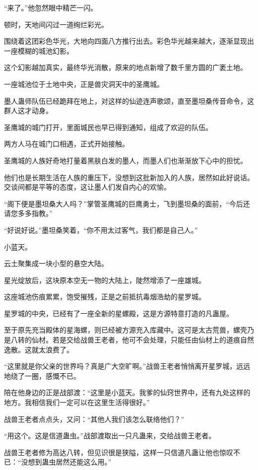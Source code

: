 \begin{this_body}
“来了。”他忽然眼中精芒一闪。

顿时，天地间闪过一道绚烂彩光。

围绕着这团彩色华光，大地向四面八方推行出去。彩色华光越来越大，逐渐显现出一座模糊的城池幻影。

这个幻影越加真实，最终华光消散，原来的地点新增了数千里方圆的广袤土地。

一座城池位于土地中央，正是兽灾洞天中的圣鹰城。

墨人蛊师队伍已经跪拜在地上，对这样的仙迹连声歌颂，直至墨坦桑传音命令，这群人这才动身。

圣鹰城的城门打开，里面城民也早已得到通知，组成了欢迎的队伍。

两方人马在城门口相遇，正式开始接触。

圣鹰城的人族好奇地打量着黑肤白发的墨人，而墨人们也渐渐放下心中的担忧。

他们也是长期生活在人族的重压下，没想到这批新加入的人族，居然如此好说话。交谈间都是平等的态度，这让墨人们发自内心的欢愉。

“阁下便是墨坦桑大人吗？”掌管圣鹰城的巨鹰勇士，飞到墨坦桑的面前，“今后还请您多多指教。”

“好说好说。”墨坦桑笑着，“你不用太过客气，我们都是自己人。”

小蓝天。

云土聚集成一块小型的悬空大陆。

星光绽放后，这块原本空无一物的大陆上，陡然增添了一座雄城。

这座城池伤痕累累，饱受摧残，正是之前抵抗毒烟浩劫的星罗城。

星罗城的中央，已经有了一座全新的星螺殿，这是方源特意打造的凡蛊屋。

至于原先充当殿体的星海螺，则已经被方源充入库藏中。这可是太古荒兽，螺壳乃是八转的仙材。若是交给战兽王老者，他可不会处理，只能任由仙材上的道痕自然逸散。这就太浪费了。

“这里就是你父亲的世界吗？真是广大空旷啊。”战兽王老者悄悄离开星罗城，远远地绕了一圈，感慨不已。

陪在他身边的正是战部渡：“这里是小蓝天。我爹的仙窍世界中，还有九处这样的地方。我相信我们一定可以在这里生活得很好。”

战兽王老者点点头，又问：“其他人我们该怎么联络他们？”

“用这个。这是信道蛊虫。”战部渡取出一只凡蛊来，交给战兽王老者。

战兽王老者修为高达八转，但见识很是狭隘，这样一只信道凡蛊让他也惊叹不已：“没想到蛊虫居然还能这么用。”


\end{this_body}
